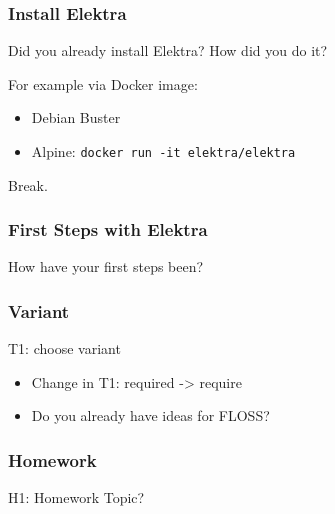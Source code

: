 \begin{frame}
	\frametitle{Install Elektra}

	\begin{task}
	Did you already install Elektra?
	How did you do it?
	\end{task}

	For example via Docker image:
	\begin{itemize}
	\item Debian Buster
	\item Alpine: \texttt{docker run -it elektra/elektra}
	\end{itemize}
\end{frame}

\begin{assignment}
	\begin{task}
	Break.
	\end{task}
\end{assignment}

\begin{frame}
	\frametitle{First Steps with Elektra}

	\begin{task}
	How have your first steps been?
	\end{task}
\end{frame}

\begin{frame}
	\frametitle{Variant}

	\begin{task}
	T1: choose variant
	\end{task}

	\begin{itemize}
	\item Change in T1: required -> require
	\item Do you already have ideas for FLOSS?
	\end{itemize}
\end{frame}

\begin{frame}
	\frametitle{Homework}

	\begin{task}
	H1: Homework Topic?
	\end{task}
\end{frame}

